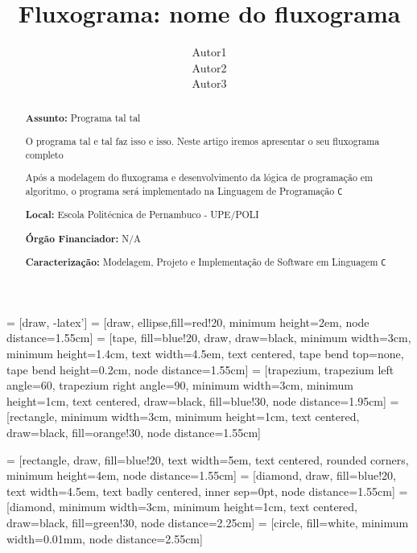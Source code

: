 \documentclass[a4paper,12pt]{article} %
\title{Fluxograma: nome do fluxograma}
\author{Autor1 \\ Autor2 \\ Autor3}
\begin{document}
\maketitle


 = [draw, -latex']
 = [draw, ellipse,fill=red!20, minimum height=2em, node distance=1.55cm]
 = [tape, fill=blue!20, draw, draw=black, minimum width=3cm, minimum height=1.4cm, text width=4.5em, text centered, tape bend top=none, tape bend height=0.2cm, node distance=1.55cm]
 = [trapezium, trapezium left angle=60, trapezium right angle=90, minimum width=3cm, minimum height=1cm, text centered, draw=black, fill=blue!30, node distance=1.95cm]
 = [rectangle, minimum width=3cm, minimum height=1cm, text centered, draw=black, fill=orange!30, node distance=1.55cm]

 = [rectangle, draw, fill=blue!20, text width=5em, text centered, rounded corners, minimum height=4em, node distance=1.55cm]
 = [diamond, draw, fill=blue!20, text width=4.5em, text badly centered, inner sep=0pt, node distance=1.55cm]
 = [diamond, minimum width=3cm, minimum height=1cm, text centered, draw=black, fill=green!30, node distance=2.25cm]
 = [circle, fill=white, minimum width=0.01mm, node distance=2.55cm]


\begin{abstract}

\textbf{Assunto:} Programa tal tal


O programa tal e tal faz isso e isso. Neste artigo iremos apresentar o seu fluxograma completo

Após a modelagem do fluxograma e desenvolvimento da lógica de programação em algoritmo,
o programa será implementado na Linguagem de Programação \texttt{C}


\textbf{Local:} Escola Politécnica de Pernambuco - UPE/POLI

\textbf{Órgão Financiador:} N/A

\textbf{Caracterização:} Modelagem, Projeto e Implementação de Software em Linguagem \texttt{C}


\end{abstract}
\end{document}
